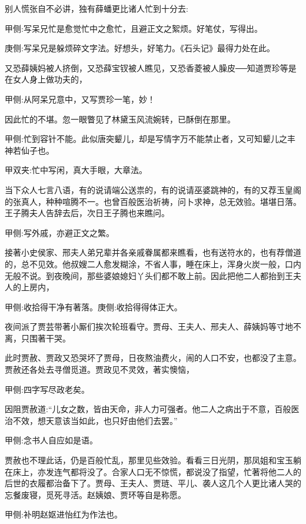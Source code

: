 \begin{parag}
    别人慌张自不必讲，独有薛蟠更比诸人忙到十分去:\begin{note}甲侧:写呆兄忙是愈觉忙中之愈忙，且避正文之絮烦。好笔仗，写得出。\end{note}\begin{note}庚侧:写呆兄是躲烦碎文字法。好想头，好笔力。《石头记》最得力处在此。\end{note}又恐薛姨妈被人挤倒，又恐薛宝钗被人瞧见，又恐香菱被人臊皮──知道贾珍等是在女人身上做功夫的，\begin{note}甲侧:从阿呆兄意中，又写贾珍一笔，妙！\end{note}因此忙的不堪。忽一眼瞥见了林黛玉风流婉转，已酥倒在那里。\begin{note}甲侧:忙到容针不能。此似唐突颦儿，却是写情字万不能禁止者，又可知颦儿之丰神若仙子也。\end{note}\begin{note}甲双夹:忙中写闲，真大手眼，大章法。\end{note}
\end{parag}


\begin{parag}
    当下众人七言八语，有的说请端公送祟的，有的说请巫婆跳神的，有的又荐玉皇阁的张真人，种种喧腾不一。也曾百般医治祈祷，问卜求神，总无效验。堪堪日落。王子腾夫人告辞去后，次日王子腾也来瞧问。\begin{note}甲侧:写外戚，亦避正文之繁。\end{note}接著小史侯家、邢夫人弟兄辈并各亲戚眷属都来瞧看，也有送符水的，也有荐僧道的，总不见效。他叔嫂二人愈发糊涂，不省人事，睡在床上，浑身火炭一般，口内无般不说。到夜晚间，那些婆娘媳妇丫头们都不敢上前。因此把他二人都抬到王夫人的上房内，\begin{note}甲侧:收拾得干净有著落。庚侧:收拾得得体正大。\end{note}夜间派了贾芸带著小厮们挨次轮班看守。贾母、王夫人、邢夫人、薛姨妈等寸地不离，只围著干哭。
\end{parag}


\begin{parag}
    此时贾赦、贾政又恐哭坏了贾母，日夜熬油费火，闹的人口不安，也都没了主意。贾赦还各处去寻僧觅道。贾政见不灵效，著实懊恼，\begin{note}甲侧:四字写尽政老矣。\end{note}因阻贾赦道:“儿女之数，皆由天命，非人力可强者。他二人之病出于不意，百般医治不效，想天意该当如此，也只好由他们去罢。”\begin{note}甲侧:念书人自应如是语。\end{note}贾赦也不理此话，仍是百般忙乱，那里见些效验。看看三日光阴，那凤姐和宝玉躺在床上，亦发连气都将没了。合家人口无不惊慌，都说没了指望，忙著将他二人的后世的衣履都治备下了。贾母、王夫人、贾琏、平儿、袭人这几个人更比诸人哭的忘餐废寝，觅死寻活。赵姨娘、贾环等自是称愿。\begin{note}甲侧:补明赵妪进怡红为作法也。\end{note}
\end{parag}


